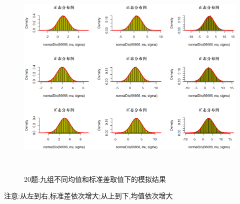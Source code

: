 \documentclass{book}
\begin{document}
\begin{figure}[H]
  \centering
  \includegraphics*[height = 10cm, width = 11.5cm]{gramFile/第二十题/九组不同均值和标准差取值下的模拟结果.PNG}
  \caption{20题:九组不同均值和标准差取值下的模拟结果}
\end{figure}
\noindent
注意:从左到右,标准差依次增大;从上到下,均值依次增大

\hspace*{\fill} \\
\end{document}
